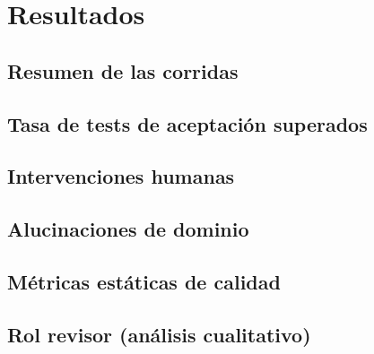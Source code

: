 \chapter{Resultados}\label{cap:resultados}


\section{Resumen de las corridas}

\section{Tasa de tests de aceptación superados}

\section{Intervenciones humanas}

\section{Alucinaciones de dominio}

\section{Métricas estáticas de calidad}

\section{Rol revisor (análisis cualitativo)}
